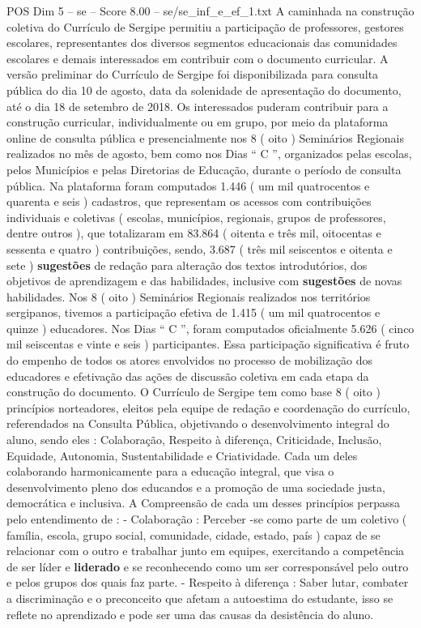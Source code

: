 \begin{textsample}{POS Dim 5 – se – Score 8.00 – se/se\_inf\_e\_ef\_1.txt}
A caminhada na construção coletiva do Currículo de Sergipe permitiu a participação de professores, gestores escolares, representantes dos diversos segmentos educacionais das comunidades escolares e demais interessados em contribuir com o documento curricular.
A versão preliminar do Currículo de Sergipe foi disponibilizada para consulta pública do dia 10 de agosto, data da solenidade de apresentação do documento, até o dia 18 de setembro de 2018.
Os interessados puderam contribuir para a construção curricular, individualmente ou em grupo, por meio da plataforma online de consulta pública e presencialmente nos 8 ( oito ) Seminários Regionais realizados no mês de agosto, bem como nos Dias “ C ”, organizados pelas escolas, pelos Municípios e pelas Diretorias de Educação, durante o período de consulta pública.
Na plataforma foram computados 1.446 ( um mil quatrocentos e quarenta e seis ) cadastros, que representam os acessos com contribuições individuais e coletivas ( escolas, municípios, regionais, grupos de professores, dentre outros ), que totalizaram em 83.864 ( oitenta e três mil, oitocentas e sessenta e quatro ) contribuições, sendo, 3.687 ( três mil seiscentos e oitenta e sete ) \textbf{sugestões} de redação para alteração dos textos introdutórios, dos objetivos de aprendizagem e das habilidades, inclusive com \textbf{sugestões} de novas habilidades.
Nos 8 ( oito ) Seminários Regionais realizados nos territórios sergipanos, tivemos a participação efetiva de 1.415 ( um mil quatrocentos e quinze ) educadores.
Nos Dias “ C ”, foram computados oficialmente 5.626 ( cinco mil seiscentas e vinte e seis ) participantes.
Essa participação significativa é fruto do empenho de todos os atores envolvidos no processo de mobilização dos educadores e efetivação das ações de discussão coletiva em cada etapa da construção do documento.
O Currículo de Sergipe tem como base 8 ( oito ) princípios norteadores, eleitos pela equipe de redação e coordenação do currículo, referendados na Consulta Pública, objetivando o desenvolvimento integral do aluno, sendo eles : Colaboração, Respeito à diferença, Criticidade, Inclusão, Equidade, Autonomia, Sustentabilidade e Criatividade.
Cada um deles colaborando harmonicamente para a educação integral, que visa o desenvolvimento pleno dos educandos e a promoção de uma sociedade justa, democrática e inclusiva.
A Compreensão de cada um desses princípios perpassa pelo entendimento de : - Colaboração : Perceber -se como parte de um coletivo ( família, escola, grupo social, comunidade, cidade, estado, país ) capaz de se relacionar com o outro e trabalhar junto em equipes, exercitando a competência de ser líder e \textbf{liderado} e se reconhecendo como um ser corresponsável pelo outro e pelos grupos dos quais faz parte. - Respeito à diferença : Saber lutar, combater a discriminação e o preconceito que afetam a autoestima do estudante, isso se reflete no aprendizado e pode ser uma das causas da desistência do aluno.

\end{textsample}
